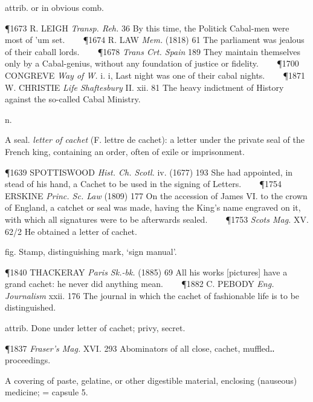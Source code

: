 \begin{description}[wide, labelwidth=!, labelindent=0pt]
\begin{myenumerate}
 attrib. or in obvious comb.

\P 1673 R. LEIGH  \textit{Transp. Reh.} 36 By this time, the Politick Cabal-men were most of 'um set.    
\P 1674 R. LAW  \textit{Mem.} (1818) 61 The parliament was jealous of their caball lords.    
\P 1678 \textit{Trans Crt. Spain} 189 They maintain themselves only by a Cabal-genius, without any foundation of justice or fidelity.    
\P 1700 CONGREVE  \textit{Way of W.} i. i, Last night was one of their cabal nights.    
\P 1871 W. CHRISTIE  \textit{Life Shaftesbury} II. xii. 81 The heavy indictment of History against the so-called Cabal Ministry.
\end{myenumerate}


 n.

\noindent {}

\vspace{-0.3cm}

\begin{myenumerate}

 A seal. \textit{letter of cachet} (F. lettre de cachet): a letter under the private seal of the French king, containing an order, often of exile or imprisonment.

\P 1639 SPOTTISWOOD  \textit{Hist. Ch. Scotl.} iv. (1677) 193 She had appointed, in stead of his hand, a Cachet to be used in the signing of Letters.    
\P 1754 ERSKINE  \textit{Princ. Sc. Law} (1809) 177 On the accession of James VI. to the crown of England, a catchet or seal was made, having the King's name engraved on it, with which all signatures were to be afterwards sealed.    
\P 1753 \textit{Scots  Mag.} XV. 62/2 He obtained a letter of cachet.

 fig. Stamp, distinguishing mark, ‘sign manual’.

\P 1840 THACKERAY  \textit{Paris Sk.-bk.} (1885) 69 All his works [pictures] have a grand cachet: he never did anything mean.    
\P 1882 C. PEBODY  \textit{Eng. Journalism} xxii. 176 The journal in which the cachet of fashionable life is to be distinguished.

 attrib. Done under letter of cachet; privy, secret.

\P 1837  \textit{Fraser's Mag.} XVI. 293 Abominators of all close, cachet, muffled‥proceedings.

 A covering of paste, gelatine, or other digestible material, enclosing (nauseous) medicine; = capsule 5.


\end{myenumerate}
\end{description}
